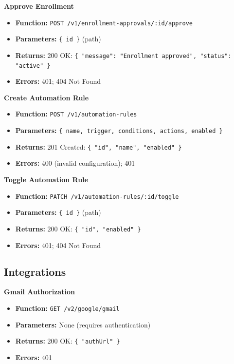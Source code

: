\documentclass[a4paper]{article}
\begin{document}
\textbf{Approve Enrollment}
\begin{itemize}
  \item \textbf{Function:} \texttt{POST /v1/enrollment-approvals/:id/approve}
  \item \textbf{Parameters:} \texttt{\{ id \}} (path)
  \item \textbf{Returns:} 200 OK: \texttt{\{ "message": "Enrollment approved", "status": "active" \}}
  \item \textbf{Errors:} 401; 404 Not Found
\end{itemize}

\textbf{Create Automation Rule}
\begin{itemize}
  \item \textbf{Function:} \texttt{POST /v1/automation-rules}
  \item \textbf{Parameters:} \texttt{\{ name, trigger, conditions, actions, enabled \}}
  \item \textbf{Returns:} 201 Created: \texttt{\{ "id", "name", "enabled" \}}
  \item \textbf{Errors:} 400 (invalid configuration); 401
\end{itemize}

\textbf{Toggle Automation Rule}
\begin{itemize}
  \item \textbf{Function:} \texttt{PATCH /v1/automation-rules/:id/toggle}
  \item \textbf{Parameters:} \texttt{\{ id \}} (path)
  \item \textbf{Returns:} 200 OK: \texttt{\{ "id", "enabled" \}}
  \item \textbf{Errors:} 401; 404 Not Found
\end{itemize}

\subsection{Integrations}

\textbf{Gmail Authorization}
\begin{itemize}
  \item \textbf{Function:} \texttt{GET /v2/google/gmail}
  \item \textbf{Parameters:} None (requires authentication)
  \item \textbf{Returns:} 200 OK: \texttt{\{ "authUrl" \}}
  \item \textbf{Errors:} 401
\end{itemize}
\end{document}
